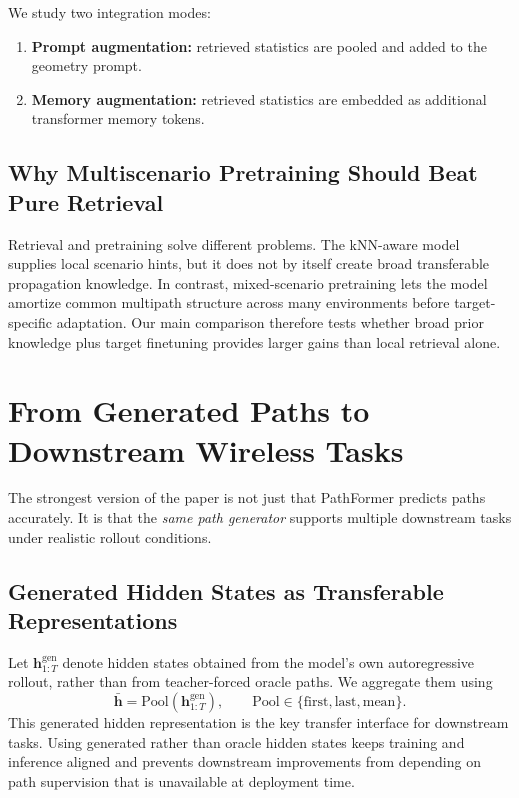 \documentclass[11pt]{article}
\begin{document}
We study two integration modes:
\begin{enumerate}[leftmargin=1.5em]
    \item \textbf{Prompt augmentation:} retrieved statistics are pooled and added to the geometry prompt.
    \item \textbf{Memory augmentation:} retrieved statistics are embedded as additional transformer memory tokens.
\end{enumerate}

\subsection{Why Multiscenario Pretraining Should Beat Pure Retrieval}
Retrieval and pretraining solve different problems. The kNN-aware model supplies local scenario hints, but it does not by itself create broad transferable propagation knowledge. In contrast, mixed-scenario pretraining lets the model amortize common multipath structure across many environments before target-specific adaptation. Our main comparison therefore tests whether broad prior knowledge plus target finetuning provides larger gains than local retrieval alone.

\section{From Generated Paths to Downstream Wireless Tasks}
The strongest version of the paper is not just that PathFormer predicts paths accurately. It is that the \emph{same path generator} supports multiple downstream tasks under realistic rollout conditions.

\subsection{Generated Hidden States as Transferable Representations}
Let $\mathbf{h}^{\mathrm{gen}}_{1:T}$ denote hidden states obtained from the model's own autoregressive rollout, rather than from teacher-forced oracle paths. We aggregate them using
\begin{equation}
\bar{\mathbf{h}}
=
\mathrm{Pool}(\mathbf{h}^{\mathrm{gen}}_{1:T}),
\qquad
\mathrm{Pool} \in \{\text{first},\text{last},\text{mean}\}.
\end{equation}
This generated hidden representation is the key transfer interface for downstream tasks. Using generated rather than oracle hidden states keeps training and inference aligned and prevents downstream improvements from depending on path supervision that is unavailable at deployment time.
\end{document}
